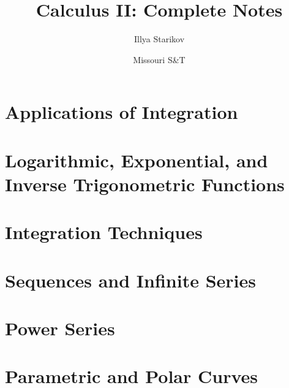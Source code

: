\documentclass[12pt]{article}
\title{Calculus II: Complete Notes}
\author{Illya Starikov}
\date{Missouri S\&T}
\begin{document}
\maketitle
\tableofcontents
\pagebreak

\setcounter{section}{5}
\section{Applications of Integration}


\section{Logarithmic, Exponential, and Inverse Trigonometric Functions}







\section{Integration Techniques}







\section{Sequences and Infinite Series}








\section{Power Series}




\section{Parametric and Polar Curves}



\end{document}
